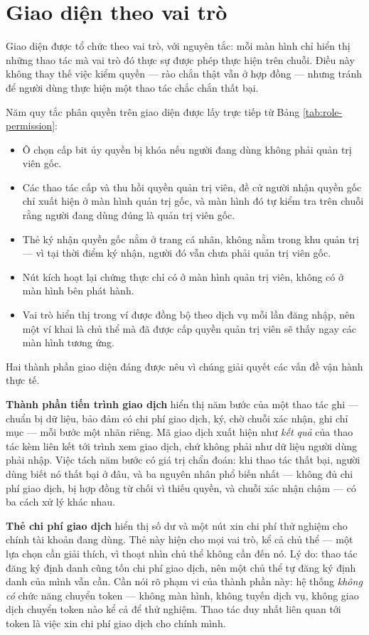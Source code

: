 \section{Giao diện theo vai trò}

Giao diện được tổ chức theo vai trò, với nguyên tắc: mỗi màn hình chỉ hiển thị những thao tác mà vai trò đó thực sự được phép thực hiện trên chuỗi. Điều này không thay thế việc kiểm quyền --- rào chắn thật vẫn ở hợp đồng --- nhưng tránh để người dùng thực hiện một thao tác chắc chắn thất bại.

Năm quy tắc phân quyền trên giao diện được lấy trực tiếp từ Bảng \ref{tab:role-permission}:

\begin{itemize}
    \item Ô chọn cấp bit ủy quyền bị khóa nếu người đang dùng không phải quản trị viên gốc.
    \item Các thao tác cấp và thu hồi quyền quản trị viên, đề cử người nhận quyền gốc chỉ xuất hiện ở màn hình quản trị gốc, và màn hình đó tự kiểm tra trên chuỗi rằng người đang dùng đúng là quản trị viên gốc.
    \item Thẻ ký nhận quyền gốc nằm ở trang cá nhân, không nằm trong khu quản trị --- vì tại thời điểm ký nhận, người đó vẫn chưa phải quản trị viên gốc.
    \item Nút kích hoạt lại chứng thực chỉ có ở màn hình quản trị viên, không có ở màn hình bên phát hành.
    \item Vai trò hiển thị trong ví được đồng bộ theo dịch vụ mỗi lần đăng nhập, nên một ví khai là chủ thể mà đã được cấp quyền quản trị viên sẽ thấy ngay các màn hình tương ứng.
\end{itemize}

Hai thành phần giao diện đáng được nêu vì chúng giải quyết các vấn đề vận hành thực tế.

\textbf{Thành phần tiến trình giao dịch} hiển thị năm bước của một thao tác ghi --- chuẩn bị dữ liệu, bảo đảm có chi phí giao dịch, ký, chờ chuỗi xác nhận, ghi chỉ mục --- mỗi bước một nhãn riêng. Mã giao dịch xuất hiện như \emph{kết quả} của thao tác kèm liên kết tới trình xem giao dịch, chứ không phải như dữ liệu người dùng phải nhập. Việc tách năm bước có giá trị chẩn đoán: khi thao tác thất bại, người dùng biết nó thất bại ở đâu, và ba nguyên nhân phổ biến nhất --- không đủ chi phí giao dịch, bị hợp đồng từ chối vì thiếu quyền, và chuỗi xác nhận chậm --- có ba cách xử lý khác nhau.

\textbf{Thẻ chi phí giao dịch} hiển thị số dư và một nút xin chi phí thử nghiệm cho chính tài khoản đang dùng. Thẻ này hiện cho mọi vai trò, kể cả chủ thể --- một lựa chọn cần giải thích, vì thoạt nhìn chủ thể không cần đến nó. Lý do: thao tác đăng ký định danh cũng tốn chi phí giao dịch, nên một chủ thể tự đăng ký định danh của mình vẫn cần. Cần nói rõ phạm vi của thành phần này: hệ thống \emph{không có} chức năng chuyển token --- không màn hình, không tuyến dịch vụ, không giao dịch chuyển token nào kể cả để thử nghiệm. Thao tác duy nhất liên quan tới token là việc xin chi phí giao dịch cho chính mình.

